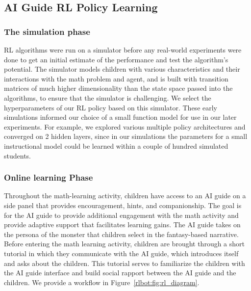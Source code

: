 \documentclass[sn-mathphys,Numbered]{sn-jnl}%
\theoremstyle{thmstyleone}%
\theoremstyle{thmstyletwo}%
\theoremstyle{thmstylethree}%
\begin{document}
\subsection{AI Guide RL Policy Learning}

\subsubsection*{The simulation phase}

 RL algorithms were run on a simulator before any real-world experiments were done to get an initial estimate of the performance and test the algorithm's potential. The simulator models children with various characteristics and their interactions with the math problem and agent, 
  and is built  with transition matrices of much higher dimensionality than the state space passed into the algorithms, to ensure that the simulator is challenging. 
 We select the hyperparameters of our RL policy based on this simulator.
 These early simulations informed our choice of a small function model for use in our later experiments. For example, we explored various multiple policy architectures and converged on 2 hidden layers,  since in our simulations the parameters for a small instructional model could be learned within a couple of hundred simulated students.

\subsubsection*{Online learning Phase}

Throughout the math-learning activity, children have access to an AI guide on a side panel that provides encouragement, hints, and companionship. The goal is for the AI guide to provide additional engagement with the math activity and provide adaptive support that facilitates learning gains. The AI guide takes on the persona of the monster that children select in the fantasy-based narrative. Before entering the math learning activity, children are brought through a short tutorial in which they communicate with the AI guide, which introduces itself and asks about the children. This tutorial serves to familiarize the children with the AI guide interface and build social rapport between the AI guide and the children. We provide a workflow in Figure~\ref{rlbot:fig:rl_diagram}.
\end{document}
